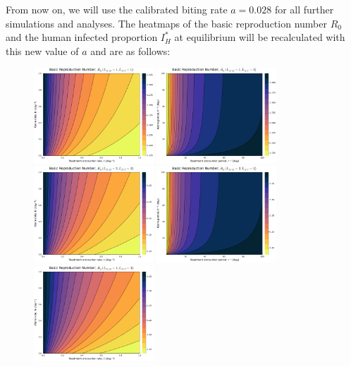 \documentclass[11pt]{article}
\begin{document}
From now on, we will use the calibrated biting rate $a=0.028$ for all further simulations and analyses. The heatmaps of the basic reproduction number $R_0$ and the human infected proportion $I_H^*$ at equilibrium will be recalculated with this new value of $a$ and are as follows:

\begin{figure}[H]
  \centering
  \includegraphics[width=0.4\textwidth]{../../fig/R0_rates_txh_1x1_cal.pdf}
  \includegraphics[width=0.4\textwidth]{../../fig/R0_periods_txh_1x1_cal.pdf}\\
  \includegraphics[width=0.4\textwidth]{../../fig/R0_rates_txh_2x2_cal.pdf}
  \includegraphics[width=0.4\textwidth]{../../fig/R0_periods_txh_2x2_cal.pdf}\\
  \includegraphics[width=0.4\textwidth]{../../fig/R0_rates_txh_4x4_cal.pdf}

\end{figure}
\end{document}
